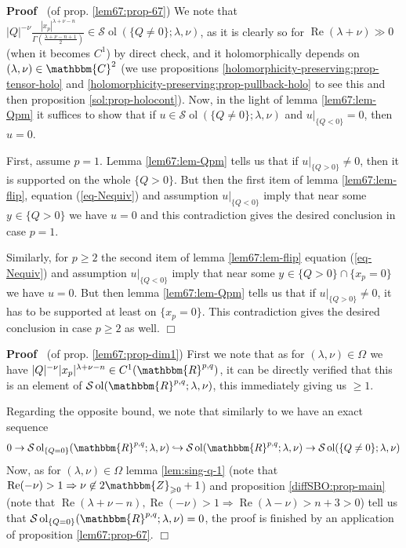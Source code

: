 \documentclass{article}
\newcommand{\nin}{\not\in}
\newcommand{\tmop}[1]{\ensuremath{\operatorname{#1}}}
\newenvironment{proof}{\noindent\textbf{Proof\ }}{\hspace*{\fill}$\Box$\medskip}
\numberwithin{definition}{section}
\numberwithin{lemma}{section}
\numberwithin{proposition}{section}
{\theorembodyfont{\rmfamily}\newtheorem{remark}{Remark}
\numberwithin{remark}{section}
}
\begin{document}
\begin{proof}
  (of prop. \ref{lem67:prop-67}) We note that $| Q |^{- \nu} \frac{| x_p
  |^{\lambda + \nu - n}}{\Gamma \left( \frac{\lambda + \nu - n + 1}{2}
  \right)} \in \mathcal{S} \tmop{ol} ( \{ Q \neq 0 \} ; \lambda, \nu)$, as it
  is clearly so for $\tmop{Re} ( \lambda + \nu) \gg 0$ (when it becomes $C^1$)
  by direct check, and it holomorphically depends on $( \lambda, \nu) \in
  \mathbbm{C}^2$ (we use propositions
  \ref{holomorphicity-preserving:prop-tensor-holo} and
  \ref{holomorphicity-preserving:prop-pullback-holo} to see this and then
  proposition \ref{sol:prop-holocont}). Now, in the light of lemma
  \ref{lem67:lem-Qpm} it suffices to show that if $u \in \mathcal{S} \tmop{ol}
  ( \{ Q \neq 0 \} ; \lambda, \nu)$ and $u |_{\{ Q < 0 \}} = 0$, then $u = 0$.
  
  First, assume $p = 1$. Lemma \ref{lem67:lem-Qpm} tells us that if $u |_{\{ Q
  > 0 \}} \neq 0$, then it is supported on the whole $\{ Q > 0 \}$. But then
  the first item of lemma \ref{lem67:lem-flip}, equation (\ref{eq-Nequiv}) and
  assumption $u |_{\{ Q < 0 \}}$ imply that near some $y_{} \in \{ Q > 0 \}$
  we have $u = 0$ and this contradiction gives the desired conclusion in case
  $p = 1$.
  
  Similarly, for $p \geqslant 2$ the second item of lemma \ref{lem67:lem-flip}
  equation (\ref{eq-Nequiv}) and assumption $u |_{\{ Q < 0 \}}$ imply that
  near some $y_{} \in \{ Q > 0 \} \cap \{ x_p = 0 \}$ we have $u = 0$. But
  then lemma \ref{lem67:lem-Qpm} tells us that if $u |_{\{ Q > 0 \}} \neq 0$,
  it has to be supported at least on $\{ x_p = 0 \}$. This contradiction gives
  the desired conclusion in case $p \geqslant 2$ as well.
\end{proof}

\begin{proof}
  (of prop. \ref{lem67:prop-dim1}) First we note that as for $( \lambda, \nu)
  \in \Omega_{}$ we have $| Q |^{- \nu} | x_p |^{\lambda + \nu - n} \in C^1 (
  \mathbbm{R}^{p, q})$, it can be directly verified that this is an element of
  $\mathcal{S} \tmop{ol} ( \mathbbm{R}^{p, q} ; \lambda, \nu)$, this
  immediately giving us $\geqslant 1$.
  
  Regarding the opposite bound, we note that similarly to
  {\cite[(6.10)]{kobayashi2015symmetry}} we have an exact sequence
  \[ 0 \rightarrow \mathcal{S} \tmop{ol}_{\{ Q = 0 \}} ( \mathbbm{R}^{p, q} ;
     \lambda, \nu) \hookrightarrow \mathcal{S} \tmop{ol} ( \mathbbm{R}^{p, q}
     ; \lambda, \nu) \rightarrow \mathcal{S} \tmop{ol} ( \{ Q \neq 0 \} ;
     \lambda, \nu) \]
  Now, as for $( \lambda, \nu) \in \Omega$ lemma \ref{lem:sing-q-1} (note that
  $\tmop{Re} ( - \nu) > 1 \Rightarrow \nu \nin 2\mathbbm{Z}_{\geqslant 0} +
  1$) and proposition \ref{diffSBO:prop-main} (note that $\tmop{Re} ( \lambda
  + \nu - n), \tmop{Re} ( - \nu) > 1 \Rightarrow \tmop{Re} ( \lambda - \nu) >
  n + 3 > 0$) tell us that $\mathcal{S} \tmop{ol}_{\{ Q = 0 \}} (
  \mathbbm{R}^{p, q} ; \lambda, \nu) = 0$, the proof is finished by an
  application of proposition \ref{lem67:prop-67}.
\end{proof}
\end{document}
